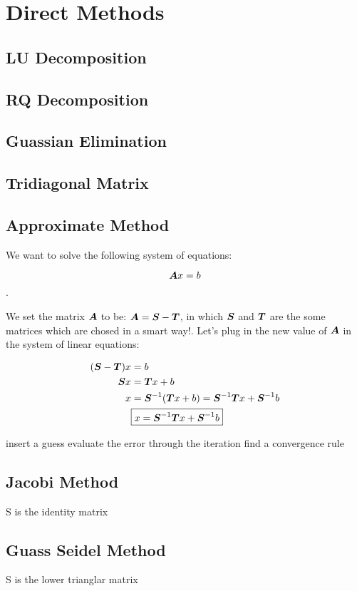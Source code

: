 



\section{Direct Methods}
\subsection{LU Decomposition}

\subsection{RQ Decomposition}

\subsection{Guassian Elimination}

\subsection{Tridiagonal Matrix}

\subsection{Approximate Method}

We want to solve the following system of equations:

\[ \boldsymbol{A} x = b \].

We set the matrix $\boldsymbol{A}$ to be: $\boldsymbol{A} = \boldsymbol{S} - \boldsymbol{T}$, in which $\boldsymbol{S}$ and $\boldsymbol{T}$ are the some matrices which are chosed in a smart way!. Let's plug in the new value of $\boldsymbol{A}$ in the system of linear equations:

\begin{align*}
	(\boldsymbol{S} - \boldsymbol{T}) x &= b \\
	\boldsymbol{S} x &= \boldsymbol{T} x + b \\
	x &= \boldsymbol{S}^{-1} (\boldsymbol{T} x + b) =  \boldsymbol{S}^{-1} \boldsymbol{T} x + \boldsymbol{S}^{-1} b \\
	&\boxed{x = \boldsymbol{S}^{-1} \boldsymbol{T} x + \boldsymbol{S}^{-1} b}
\end{align*}



insert a guess
evaluate the error through the iteration
find a convergence rule

\subsection{Jacobi Method}

S is the identity matrix

\subsection{Guass Seidel Method}

S is the lower trianglar matrix





